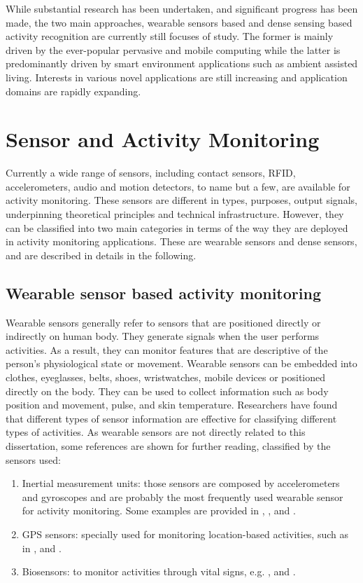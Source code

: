 While substantial research has been undertaken, and significant progress has been made, the two main approaches, wearable sensors based and dense sensing based activity recognition are currently still focuses of study. The former is mainly driven by the ever-popular pervasive and mobile computing while the latter is predominantly driven by smart environment applications such as ambient assisted living. Interests in various novel applications are still increasing and application domains are rapidly expanding.

\section{Sensor and Activity Monitoring}
\label{sec:soa-monitoring}

Currently a wide range of sensors, including contact sensors, RFID, accelerometers, audio and motion detectors, to name but a few, are available for activity monitoring. These sensors are different in types, purposes, output signals, underpinning theoretical principles and technical infrastructure. However, they can be classified into two main categories in terms of the way they are deployed in activity monitoring applications. These are wearable sensors and dense sensors, and are described in details in the following.

\subsection{Wearable sensor based activity monitoring}

Wearable sensors generally refer to sensors that are positioned directly or indirectly on human body. They generate signals when the user performs activities. As a result, they can monitor features that are descriptive of the person’s physiological state or movement. Wearable sensors can be embedded into clothes, eyeglasses, belts, shoes, wristwatches, mobile devices or positioned directly on the body. They can be used to collect information such as body position and movement, pulse, and skin temperature. Researchers have found that different types of sensor information are effective for classifying different types of activities. As wearable sensors are not directly related to this dissertation, some references are shown for further reading, classified by the sensors used:

\begin{enumerate}
 \item Inertial measurement units: those sensors are composed by accelerometers and gyroscopes and are probably the most frequently used wearable sensor for activity monitoring. Some examples are provided in \cite{Bao2004}, \cite{Lukowicz2004}, \cite{Lee2002} and \cite{Mantyjarvi2001}.
 \item GPS sensors: specially used for monitoring location-based activities, such as in \cite{Patterson2003}, \cite{Ashbrook2003} and \cite{Liao2007a}.
 \item Biosensors: to monitor activities through vital signs, e.g. \cite{Sung2004}, \cite{Harms2008} and \cite{Finni2007}.
\end{enumerate}

